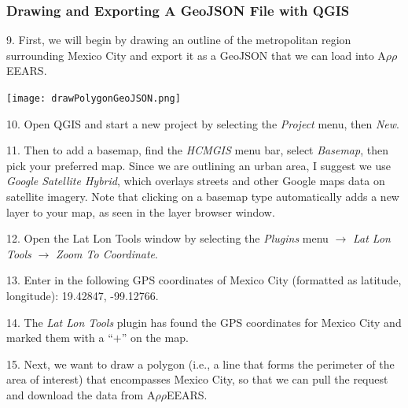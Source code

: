 \documentclass[oneside,a4paper,11pt,explicit]{book}
\begin{document}
\subsubsection{Drawing and Exporting A GeoJSON File with QGIS}

9. First, we will begin by drawing an outline of the metropolitan region surrounding Mexico City and export it as a GeoJSON that we can load into A$\rho\rho$EEARS. 

\vspace{.5em}

\centerline{\texttt{[image: drawPolygonGeoJSON.png]}}

\vspace{.5em}

10. Open QGIS and start a new project by selecting the \textit{Project} menu, then \textit{New}.

11. Then to add a basemap, find the \textit{HCMGIS} menu bar, select \textit{Basemap}, then pick your preferred map. Since we are outlining an urban area, I suggest we use \textit{Google Satellite Hybrid}, which overlays streets and other Google maps data on satellite imagery. Note that clicking on a basemap type automatically adds a new layer to your map, as seen in the layer browser window.

12. Open the Lat Lon Tools window by selecting the \textit{Plugins} menu $\rightarrow$ \textit{Lat Lon Tools} $\rightarrow$ \textit{Zoom To Coordinate}.
	
13. Enter in the following GPS coordinates of Mexico City (formatted as latitude, longitude): 19.42847, -99.12766.
	
14. The \textit{Lat Lon Tools} plugin has found the GPS coordinates for Mexico City and marked them with a ``$+$'' on the map. 

15. Next, we want to draw a polygon (i.e., a line that forms the perimeter of the area of interest) that encompasses Mexico City, so that we can pull the request and download the data from A$\rho\rho$EEARS.
	
\end{document}
